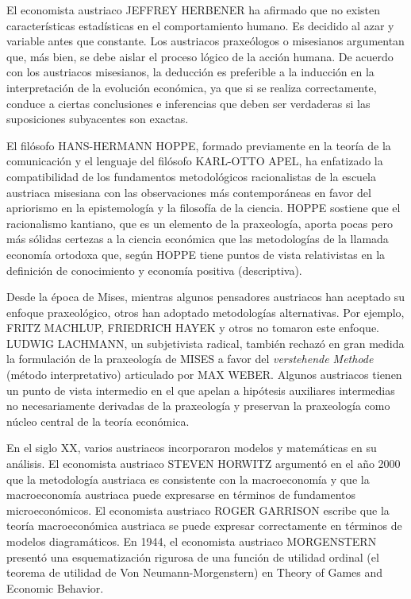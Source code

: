 \documentclass[10pt,a4paper]{article}
\begin{document}
El economista austriaco JEFFREY HERBENER ha afirmado que no existen características estadísticas en el comportamiento humano. Es decidido al azar y variable antes que constante. Los austriacos praxeólogos o misesianos argumentan que, más bien, se debe aislar el proceso lógico de la acción humana. De acuerdo con los austriacos misesianos, la deducción es preferible a la inducción en la interpretación de la evolución económica, ya que si se realiza correctamente, conduce a ciertas conclusiones e inferencias que deben ser verdaderas si las suposiciones subyacentes son exactas. 

El filósofo HANS-HERMANN HOPPE, formado previamente en la teoría de la comunicación y el lenguaje del filósofo KARL-OTTO APEL, ha enfatizado la compatibilidad de los fundamentos metodológicos racionalistas de la escuela austriaca misesiana con las observaciones más contemporáneas en favor del apriorismo en la epistemología y la filosofía de la ciencia. HOPPE sostiene que el racionalismo kantiano, que es un elemento de la praxeología, aporta pocas pero más sólidas certezas a la ciencia económica que las metodologías de la llamada economía ortodoxa que, según HOPPE tiene puntos de vista relativistas en la definición de conocimiento y economía positiva (descriptiva).

Desde la época de Mises, mientras algunos pensadores austriacos han aceptado su enfoque praxeológico, otros han adoptado metodologías alternativas. Por ejemplo, FRITZ MACHLUP, FRIEDRICH HAYEK y otros no tomaron este enfoque. LUDWIG LACHMANN, un subjetivista radical, también rechazó en gran medida la formulación de la praxeología de MISES a favor del \textit{verstehende Methode} (método interpretativo) articulado por MAX WEBER. Algunos austriacos tienen un punto de vista intermedio en el que apelan a hipótesis auxiliares intermedias no necesariamente derivadas de la praxeología y preservan la praxeología como núcleo central de la teoría económica.

En el siglo XX, varios austriacos incorporaron modelos y matemáticas en su análisis. El economista austriaco STEVEN HORWITZ argumentó en el año 2000 que la metodología austriaca es consistente con la macroeconomía y que la macroeconomía austriaca puede expresarse en términos de fundamentos microeconómicos. El economista austriaco ROGER GARRISON escribe que la teoría macroeconómica austriaca se puede expresar correctamente en términos de modelos diagramáticos. En 1944, el economista austriaco MORGENSTERN presentó una esquematización rigurosa de una función de utilidad ordinal (el teorema de utilidad de Von Neumann-Morgenstern) en Theory of Games and Economic Behavior.
\end{document}
